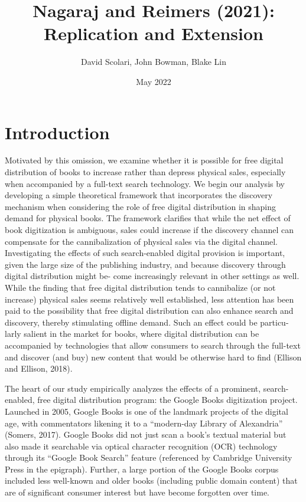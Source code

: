\documentclass{article}
\author{David Scolari, John Bowman, Blake Lin}
\title{Nagaraj and Reimers (2021): Replication and Extension}
\date{May 2022}
\begin{document}
\maketitle

\begin{abstract}
\end{abstract}

\section{Introduction}

Motivated by this omission, we examine whether it is possible for free digital distribution of books to increase rather than depress physical sales, especially when accompanied by a full-text search technology. We begin our analysis by developing a simple theoretical framework that incorporates the discovery mechanism when considering the role of free digital distribution in shaping demand for physical books. The framework clarifies that while the net effect of book digitization is ambiguous, sales could increase if the discovery channel can compensate for the cannibalization of physical sales via the digital channel. Investigating the effects of such search-enabled digital provision is important, given the large size of the publishing industry, and because discovery through digital distribution might be- come increasingly relevant in other settings as well. While the finding that free digital distribution tends to cannibalize (or not increase) physical sales seems relatively well established, less attention has been paid to the possibility that free digital distribution can also enhance search and discovery, thereby stimulating offline demand. Such an effect could be particu- larly salient in the market for books, where digital distribution can be accompanied by technologies that allow consumers to search through the full-text and discover (and buy) new content that would be otherwise hard to find (Ellison and Ellison, 2018).

The heart of our study empirically analyzes the effects of a prominent, search-enabled, free digital
distribution program: the Google Books digitization project. Launched in 2005, Google Books is one of the
landmark projects of the digital age, with commentators likening it to a “modern-day Library of Alexandria”
(Somers, 2017). Google Books did not just scan a book’s textual material but also made it searchable via
optical character recognition (OCR) technology through its “Google Book Search” feature (referenced by
Cambridge University Press in the epigraph). Further, a large portion of the Google Books corpus included
less well-known and older books (including public domain content) that are of significant consumer interest
but have become forgotten over time.
\end{document}
